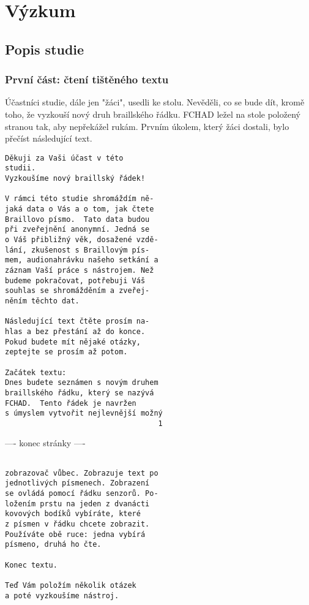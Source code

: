 \chapter{Výzkum}

\section{Popis studie}

\subsection{První část: čtení tištěného textu}

Účastníci studie, dále jen "žáci", usedli ke stolu.  Nevěděli, co se bude dít, kromě toho, že vyzkouší nový druh braillského řádku.  FCHAD ležel na stole položený stranou tak, aby nepřekážel rukám.  Prvním úkolem, který žáci dostali, bylo přečíst následující text.

\begin{verbatim}
Děkuji za Vaši účast v této
studii.
Vyzkoušíme nový braillský řádek!

V rámci této studie shromáždím ně-
jaká data o Vás a o tom, jak čtete
Braillovo písmo.  Tato data budou
při zveřejnění anonymní. Jedná se
o Váš přibližný věk, dosažené vzdě-
lání, zkušenost s Braillovým pís-
mem, audionahrávku našeho setkání a
záznam Vaší práce s nástrojem. Než
budeme pokračovat, potřebuji Váš
souhlas se shromážděním a zveřej-
něním těchto dat.

Následující text čtěte prosím na-
hlas a bez přestání až do konce.
Pokud budete mít nějaké otázky,
zeptejte se prosím až potom.

Začátek textu:
Dnes budete seznámen s novým druhem
braillského řádku, který se nazývá
FCHAD.  Tento řádek je navržen
s úmyslem vytvořit nejlevnější možný
                                   1
\end{verbatim}
---- konec stránky ----
\begin{verbatim}

zobrazovač vůbec. Zobrazuje text po
jednotlivých písmenech. Zobrazení
se ovládá pomocí řádku senzorů. Po-
ložením prstu na jeden z dvanácti
kovových bodíků vybíráte, které
z písmen v řádku chcete zobrazit.
Používáte obě ruce: jedna vybírá
písmeno, druhá ho čte.

Konec textu.

Teď Vám položím několik otázek
a poté vyzkoušíme nástroj.

\end{verbatim}

